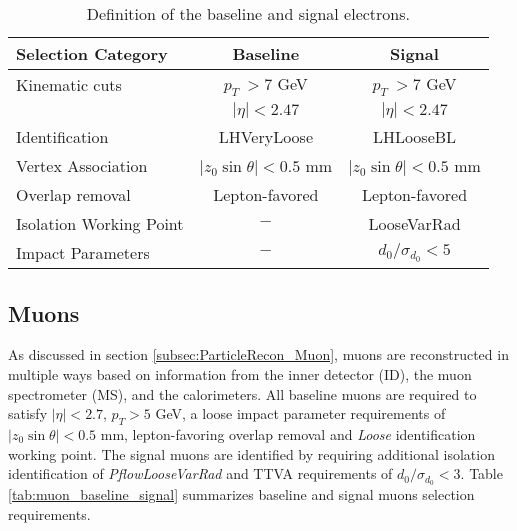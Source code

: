 \begin{table}[ht]
	\centering
		\caption{Definition of the baseline and signal electrons.\label{tab:Electron_RecoSel}}
		\begin{tabular}{|| l || c | c ||}
		\hline
		Selection Category & \textbf{Baseline} & \textbf{Signal} \\
		\hline\hline
		Kinematic cuts & $p_{T}~ > 7$ GeV & $ p_{T}~ > 7$ GeV \\
		            & $|\eta| < 2.47$  &  $|\eta| < 2.47$\\
		\hline  
		Identification & LHVeryLoose & LHLooseBL \\
		\hline 
		Vertex Association & $|z_{0}\sin\theta| < 0.5$ mm & $|z_{0}\sin\theta|< 0.5$ mm\\
		\hline
		Overlap removal & Lepton-favored & Lepton-favored\\
		\hline
		Isolation Working Point & $-$ & LooseVarRad\\
		\hline 
		Impact Parameters & $-$ & $d_{0}/ \sigma_{d_{0}} < 5$ \\
		\hline
	\end{tabular}
\end{table}

\subsection{Muons}
\label{subsec:MuonRecon}
As discussed in section \ref{subsec:ParticleRecon_Muon}, muons are reconstructed in multiple ways based on information from the inner detector (ID), the muon spectrometer (MS), and the calorimeters. All baseline muons are required to satisfy $ |\eta| < 2.7 $, $p_{T} > 5$ GeV, a loose impact parameter requirements of $|z_{0}\sin\theta| < 0.5 $ mm, lepton-favoring overlap removal and \textit{Loose} identification working point. The signal muons are identified by requiring additional isolation identification of \textit{PflowLooseVarRad} and TTVA requirements of $d_{0}/\sigma_{d_{0}} < 3$. Table \ref{tab:muon_baseline_signal} summarizes baseline and signal muons selection requirements.


